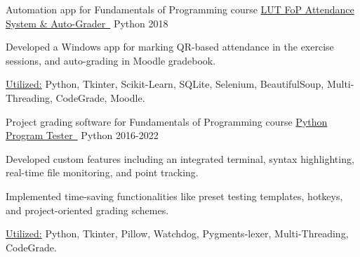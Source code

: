 

\begin{cventries}
 
  \cventryprojects
  {Automation app for Fundamentals of Programming course} %
  {\href{https://www.hamidurrk.com/projects?project=queue}{LUT FoP Attendance System \& Auto-Grader\ {\mdseries\faExternalLink}}} %
  {Python} %
  {2018} %
  {
    \begin{cvitems} %
      \item { Developed a Windows app for marking QR-based attendance in the exercise sessions, and auto-grading in Moodle gradebook.}
      \item {\underline{Utilized:} Python, Tkinter, Scikit-Learn, SQLite, Selenium, BeautifulSoup, Multi-Threading, CodeGrade, Moodle.}
    \end{cvitems}
    }    
  \cventryprojects
  {Project grading software for Fundamentals of Programming course} %
  {\href{https://www.hamidurrk.com/projects?project=python-program-tester}{Python Program Tester\ {\mdseries\faExternalLink}}} %
  {Python} %
  {2016-2022} %
  {
    \begin{cvitems} %
      \item {Developed custom features including an integrated terminal, syntax highlighting, real-time file monitoring, and point tracking.}
      \item {Implemented time-saving functionalities like preset testing templates, hotkeys, and project-oriented grading schemes.}
      \item {\underline{Utilized:} Python, Tkinter, Pillow, Watchdog, Pygments-lexer, Multi-Threading, CodeGrade.}
    \end{cvitems}
    }    

\end{cventries}

